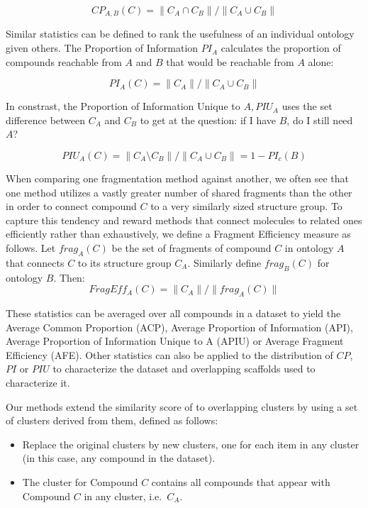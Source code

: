 \documentclass[journal=jacsat,manuscript=article]{achemso}
\newcommand*\ie{i.e.~}
\begin{document}
\begin{equation}
CP_{A,B}(C) = \| C_A \cap C_B \| / \| C_A \cup C_B \|
\end{equation}

Similar statistics can be defined to rank the usefulness of an individual ontology given others. The Proportion of Information $PI_A$ calculates the proportion of compounds reachable from $A$ and $B$ that would be reachable from $A$ alone:

\begin{equation}
PI_A(C) = \| C_A \| / \| C_A \cup C_B \|
\end{equation}

In constrast, the Proportion of Information Unique to $A, PIU_A$ uses the set difference between $C_A$ and $C_B$ to get at the question: if I have $B$, do I still need $A$? 

\begin{equation}
 PIU_A(C) = \| C_A \setminus C_B \| / \| C_A \cup C_B \| = 1 - PI_c(B)
 \end{equation}
  
When comparing one fragmentation method against another, we often see that one method utilizes a vastly greater number of shared fragments than the other in order to connect compound $C$ to a very similarly sized structure group. To capture this tendency and reward methods that connect molecules to related ones efficiently rather than exhaustively, we define a Fragment Efficiency measure as follows. Let $frag_A(C)$ be the set of fragments of compound $C$ in ontology $A$ that connects $C$ to its structure group $C_A$. Similarly define $frag_B(C)$ for ontology $B$. Then: 
\begin{equation}
FragEff_A(C) = \| C_A \| / \| frag_A(C) \|
\end{equation}


These statistics can be averaged over all compounds in a dataset to yield the Average Common Proportion (ACP), Average Proportion of Information (API), Average Proportion of Information Unique to A (APIU) or Average Fragment Efficiency (AFE).  Other statistics can also be applied to the distribution of $CP$, $PI$ or $PIU$ to characterize the dataset and overlapping scaffolds used to characterize it.

Our methods extend the similarity score of \citeauthor{Torres2009} to
overlapping clusters by using a set of clusters
derived from them, defined as follows:
\begin{itemize}
\item Replace the original clusters by new clusters, one for each item
  in any cluster (in this case, any compound in the dataset).
\item The cluster for Compound $C$ contains all compounds that appear
  with Compound $C$ in any cluster, \ie $C_A$.
\end{itemize}
\end{document}
